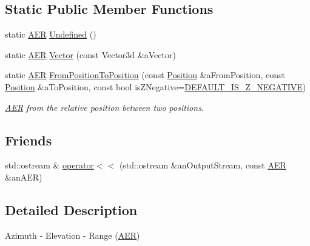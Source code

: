 \subsection*{Static Public Member Functions}
\begin{DoxyCompactItemize}
\item 
static \hyperlink{classostk_1_1physics_1_1coord_1_1spherical_1_1_a_e_r}{A\+ER} \hyperlink{classostk_1_1physics_1_1coord_1_1spherical_1_1_a_e_r_a5046e91d1757a8f94e212d621e5c48b9}{Undefined} ()
\item 
static \hyperlink{classostk_1_1physics_1_1coord_1_1spherical_1_1_a_e_r}{A\+ER} \hyperlink{classostk_1_1physics_1_1coord_1_1spherical_1_1_a_e_r_a9d843e5e09faec5bfdd0b333b5380778}{Vector} (const Vector3d \&a\+Vector)
\item 
static \hyperlink{classostk_1_1physics_1_1coord_1_1spherical_1_1_a_e_r}{A\+ER} \hyperlink{classostk_1_1physics_1_1coord_1_1spherical_1_1_a_e_r_a20a15cda64a7bae95d6a589ab026e79c}{From\+Position\+To\+Position} (const \hyperlink{classostk_1_1physics_1_1coord_1_1_position}{Position} \&a\+From\+Position, const \hyperlink{classostk_1_1physics_1_1coord_1_1_position}{Position} \&a\+To\+Position, const bool is\+Z\+Negative=\hyperlink{_a_e_r_8hpp_ad8664c02b311aafcd585591322188845}{D\+E\+F\+A\+U\+L\+T\+\_\+\+I\+S\+\_\+\+Z\+\_\+\+N\+E\+G\+A\+T\+I\+VE})
\begin{DoxyCompactList}\small\item\em \hyperlink{classostk_1_1physics_1_1coord_1_1spherical_1_1_a_e_r}{A\+ER} from the relative position between two positions. \end{DoxyCompactList}\end{DoxyCompactItemize}
\subsection*{Friends}
\begin{DoxyCompactItemize}
\item 
std\+::ostream \& \hyperlink{classostk_1_1physics_1_1coord_1_1spherical_1_1_a_e_r_ac5514fc65bf0bd3f4f5870b246cff3ad}{operator$<$$<$} (std\+::ostream \&an\+Output\+Stream, const \hyperlink{classostk_1_1physics_1_1coord_1_1spherical_1_1_a_e_r}{A\+ER} \&an\+A\+ER)
\end{DoxyCompactItemize}


\subsection{Detailed Description}
Azimuth -\/ Elevation -\/ Range (\hyperlink{classostk_1_1physics_1_1coord_1_1spherical_1_1_a_e_r}{A\+ER}) 

